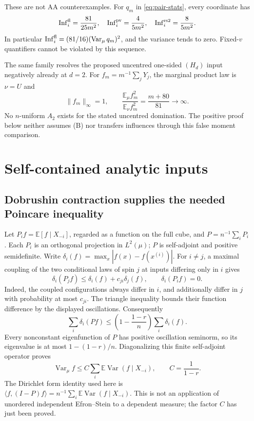 \documentclass[11pt]{article}
\newcommand{\E}{\mathbb E}
\newcommand{\Var}{\operatorname{Var}}
\newcommand{\Inf}{\operatorname{Inf}}
\begin{document}
These are not AA counterexamples. For $q_m$ in
\eqref{eq:pair-stats}, every coordinate has
\[
 \Inf_i^{\rm fl}=\frac{81}{25m^2},\quad
 \Inf_i^{\rm pv}=\frac4{5m^2},\quad
 \Inf_i^{\rm rs2}=\frac8{5m^2}.
\]
In particular $\Inf_i^{\rm fl}=(81/16)(\Var_\mu q_m)^2$,
and the variance tends to zero. Fixed-$v$ quantifiers cannot be
violated by this sequence.

The same family resolves the proposed uncentred one-sided $(H_d)$
input negatively already at $d=2$. For $f_m=m^{-1}\sum_jY_j$,
the marginal product law is $\nu=U$ and
\[
 \|f_m\|_\infty=1,\qquad
 \frac{\E_\mu f_m^2}{\E_\nu f_m^2}
 =\frac{m+80}{81}\longrightarrow\infty.
\]
No $n$-uniform $A_2$ exists for the stated uncentred domination.
The positive proof below neither assumes (B) nor transfers influences
through this false moment comparison.

\section{Self-contained analytic inputs}

\subsection{Dobrushin contraction supplies the needed Poincare inequality}

Let $P_i f=\E[f\mid X_{-i}]$, regarded as a function on the full
cube, and $P=n^{-1}\sum_iP_i$. Each $P_i$ is an orthogonal
projection in $L^2(\mu)$; $P$ is self-adjoint and positive
semidefinite. Write
$\delta_i(f)=\max_x|f(x)-f(x^{(i)})|$.
For $i\ne j$, a maximal coupling of the two conditional laws of
spin $j$ at inputs differing only in $i$ gives
\[
 \delta_i(P_j f)\le\delta_i(f)+c_{ji}\delta_j(f),
 \qquad \delta_i(P_i f)=0.
\]
Indeed, the coupled configurations always differ in $i$, and
additionally differ in $j$ with probability at most $c_{ji}$.
The triangle inequality bounds their function difference by the
displayed oscillations. Consequently
\[
 \sum_i\delta_i(Pf)\le
 \left(1-\frac{1-r}{n}\right)\sum_i\delta_i(f).
\]
Every nonconstant eigenfunction of $P$ has positive oscillation
seminorm, so its eigenvalue is at most $1-(1-r)/n$.
Diagonalizing this finite self-adjoint operator proves
\begin{equation}
 \Var_\mu f\le C\sum_i\E\Var(f\mid X_{-i}),
 \qquad C=\frac1{1-r}.
 \label{eq:poincare}
\end{equation}
The Dirichlet form identity used here is
$\langle f,(I-P)f\rangle=n^{-1}\sum_i\E\Var(f\mid X_{-i})$.
This is not an application of unordered independent Efron--Stein
to a dependent measure; the factor $C$ has just been proved.
\end{document}
